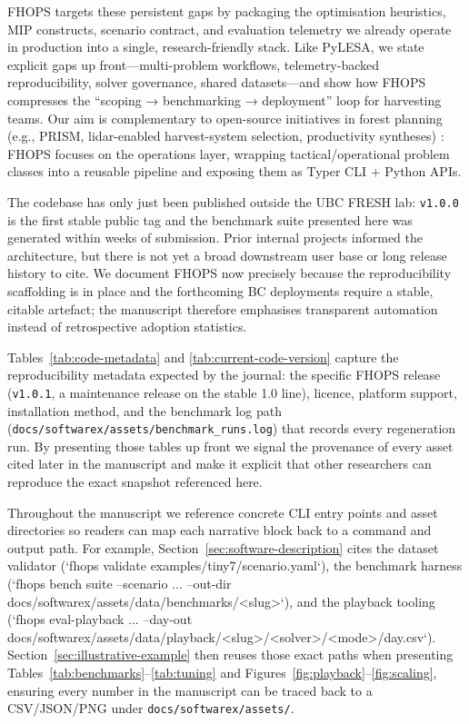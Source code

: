FHOPS targets these persistent gaps by packaging the optimisation heuristics, MIP constructs, scenario contract, and evaluation telemetry we already operate in production into a single, research-friendly stack. Like PyLESA, we state explicit gaps up front—multi-problem workflows, telemetry-backed reproducibility, solver governance, shared datasets—and show how FHOPS compresses the “scoping → benchmarking → deployment” loop for harvesting teams. Our aim is complementary to open-source initiatives in forest planning (e.g., PRISM, lidar-enabled harvest-system selection, productivity syntheses) \cite{nguyen2022prism,becker2018lidar,lahrsen2022productivity}: FHOPS focuses on the operations layer, wrapping tactical/operational problem classes into a reusable pipeline and exposing them as Typer CLI + Python APIs.

The codebase has only just been published outside the UBC FRESH lab: \texttt{v1.0.0} is the first stable public tag and the benchmark suite presented here was generated within weeks of submission. Prior internal projects informed the architecture, but there is not yet a broad downstream user base or long release history to cite. We document FHOPS now precisely because the reproducibility scaffolding is in place and the forthcoming BC deployments require a stable, citable artefact; the manuscript therefore emphasises transparent automation instead of retrospective adoption statistics.

Tables~\ref{tab:code-metadata} and \ref{tab:current-code-version} capture the reproducibility metadata expected by the journal: the specific FHOPS release (\texttt{v1.0.1}, a maintenance release on the stable 1.0 line), licence, platform support, installation method, and the benchmark log path (\texttt{docs/softwarex/assets/benchmark\_runs.log}) that records every regeneration run. By presenting those tables up front we signal the provenance of every asset cited later in the manuscript and make it explicit that other researchers can reproduce the exact snapshot referenced here.

Throughout the manuscript we reference concrete CLI entry points and asset directories so readers can map each narrative block back to a command and output path. For example, Section~\ref{sec:software-description} cites the dataset validator (`fhops validate examples/tiny7/scenario.yaml`), the benchmark harness (`fhops bench suite --scenario ... --out-dir docs/softwarex/assets/data/benchmarks/<slug>`), and the playback tooling (`fhops eval-playback ... --day-out docs/softwarex/assets/data/playback/<slug>/<solver>/<mode>/day.csv`). Section~\ref{sec:illustrative-example} then reuses those exact paths when presenting Tables~\ref{tab:benchmarks}--\ref{tab:tuning} and Figures~\ref{fig:playback}--\ref{fig:scaling}, ensuring every number in the manuscript can be traced back to a CSV/JSON/PNG under \texttt{docs/softwarex/assets/}.

